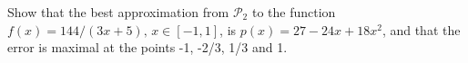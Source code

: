 \begin{problem}
  Show that the best approximation from $\mathcal{P}_2$ to the
  function $f(x) = 144/(3x + 5), \, x \in [−1, 1]$, is $p(x) = 27 −
  24x + 18x^2$, and that the error is maximal at the points -1, -2/3,
  1/3 and 1.
\end{problem}


\begin{solution}

\end{solution}
